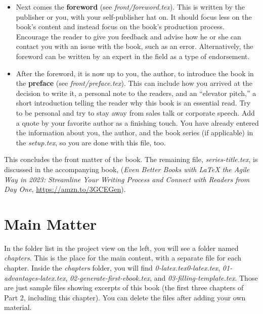 \begin{itemize}
    \item Next comes the \textbf{foreword} (see \textit{front/foreword.tex}). This is written by the publisher or you, with your self-publisher hat on. It should focus less on the book's content and instead focus on the book's production process. Encourage the reader to give you feedback and advise how he or she can contact you with an issue with the book, such as an error. Alternatively, the foreword can be written by an expert in the field as a type of endorsement.

    \item After the foreword, it is now up to you, the author, to introduce the book in the \textbf{preface} (see \textit{front/preface.tex}). This can include how you arrived at the decision to write it, a personal note to the readers, and an ``elevator pitch,'' a short introduction telling the reader why this book is an essential read. Try to be personal and try to stay away from sales talk or corporate speech. Add a quote by your favorite author as a finishing touch. You have already entered the information about you, the author, and the book series (if applicable) in the \textit{setup.tex}, so you are done with this file, too.

\end{itemize}

This concludes the front matter of the book. The remaining file, \textit{series-title.tex}, is discussed in the accompanying book, (\textit{Even Better Books with LaTeX the Agile Way in 2023: Streamline Your Writing Process and Connect with Readers from Day One}, \url{https://amzn.to/3GCEGen}).


\newpage\section{Main Matter}
\label{mainmatter:sec}

In the folder list in the project view on the left, you will see a folder named \textit{chapters}. This is the place for the main content, with a separate file for each chapter. Inside the \textit{chapters} folder, you will find \textit{0-latex.tex}\textit{0-latex.tex}, \textit{01-advantages-latex.tex}, \textit{02-generate-first-ebook.tex}, and \textit{03-filling-template.tex}. Those are just sample files showing excerpts of this book (the first three chapters of Part 2, including this chapter). You can delete the files after adding your own material.

